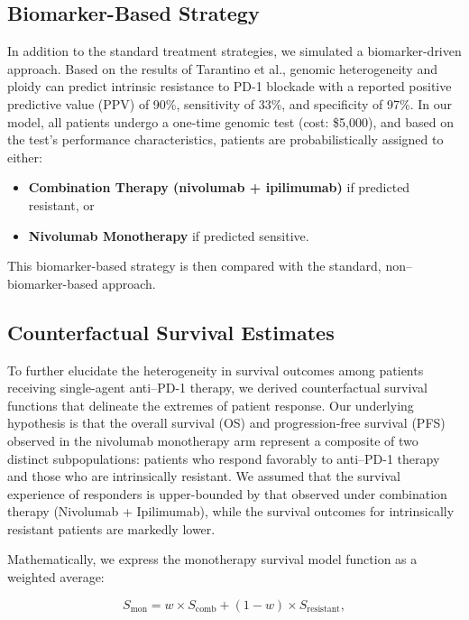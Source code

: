 \documentclass[preprint, 3p,
authoryear]{elsarticle} %
\begin{document}
\subsection{Biomarker-Based Strategy}\label{biomarker-based-strategy}

In addition to the standard treatment strategies, we simulated a
biomarker-driven approach. Based on the results of Tarantino et al.,
genomic heterogeneity and ploidy can predict intrinsic resistance to
PD-1 blockade with a reported positive predictive value (PPV) of 90\%,
sensitivity of 33\%, and specificity of 97\%. In our model, all patients
undergo a one-time genomic test (cost: \$5,000), and based on the test's
performance characteristics, patients are probabilistically assigned to
either:

\begin{itemize}
\item
  \textbf{Combination Therapy (nivolumab + ipilimumab)} if predicted
  resistant, or
\item
  \textbf{Nivolumab Monotherapy} if predicted sensitive.
\end{itemize}

This biomarker-based strategy is then compared with the standard,
non--biomarker-based approach.

\subsection{Counterfactual Survival
Estimates}\label{counterfactual-survival-estimates}

To further elucidate the heterogeneity in survival outcomes among
patients receiving single-agent anti--PD-1 therapy, we derived
counterfactual survival functions that delineate the extremes of patient
response. Our underlying hypothesis is that the overall survival (OS)
and progression-free survival (PFS) observed in the nivolumab
monotherapy arm represent a composite of two distinct subpopulations:
patients who respond favorably to anti--PD-1 therapy and those who are
intrinsically resistant. We assumed that the survival experience of
responders is upper-bounded by that observed under combination therapy
(Nivolumab + Ipilimumab), while the survival outcomes for intrinsically
resistant patients are markedly lower.

Mathematically, we express the monotherapy survival model function as a
weighted average:

\[
S_{\text{mon}} = w \times S_{\text{comb}} + (1 - w) \times S_{\text{resistant}},
\]
\end{document}
